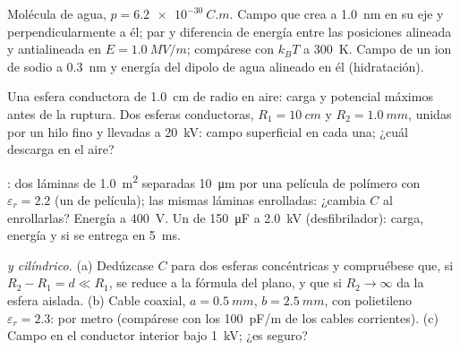 \begin{exercise}[$\star\star$]\label{exo:b1:potential-capacitors:7}
Molécula de agua, $p = \qty{6.2e-30}{C.m}$. Campo que crea a \qty{1.0}{nm}
en su eje y perpendicularmente a él; par y diferencia de energía entre
las posiciones alineada y antialineada en $E = \qty{1.0}{MV/m}$;
compárese con $k_BT$ a \qty{300}{K}. Campo de un ion de sodio a
\qty{0.3}{nm} y energía del dipolo de agua alineado en él (hidratación).
\end{exercise}

\begin{exercise}[$\star\star$]\label{exo:b1:potential-capacitors:8}
Una esfera conductora de \qty{1.0}{cm} de radio en aire: carga y potencial
máximos antes de la ruptura. Dos esferas conductoras, $R_1 = \qty{10}{cm}$
y $R_2 = \qty{1.0}{mm}$, unidas por un hilo fino y llevadas a
\qty{20}{kV}: campo superficial en cada una; ¿cuál descarga en el aire?
\end{exercise}

\begin{exercise}[$\star\star$]\label{exo:b1:potential-capacitors:9}
: dos láminas de \qty{1.0}{m^2} separadas \qty{10}{\micro m}
por una película de polímero con $\varepsilon_r = 2.2$ (un  de
película); las mismas láminas enrolladas: ¿cambia $C$ al enrollarlas?
Energía a \qty{400}{V}. Un  de \qty{150}{\micro F} a
\qty{2.0}{kV} (desfibrilador): carga, energía y  si se
entrega en \qty{5}{ms}.
\end{exercise}

\begin{exercise}[$\star\star\star$]\label{exo:b1:potential-capacitors:10}
\emph{ y cilíndrico.} (a) Dedúzcase $C$ para dos
esferas concéntricas y compruébese que, si $R_2 - R_1 = d \ll R_1$, se
reduce a la fórmula del plano, y que si $R_2 \to \infty$ da la esfera
aislada. (b) Cable coaxial, $a = \qty{0.5}{mm}$, $b = \qty{2.5}{mm}$, con
polietileno $\varepsilon_r = 2.3$:  por metro (compárese con los
\qty{100}{pF/m} de los cables corrientes). (c) Campo en el conductor
interior bajo \qty{1}{kV}; ¿es seguro?
\end{exercise}

